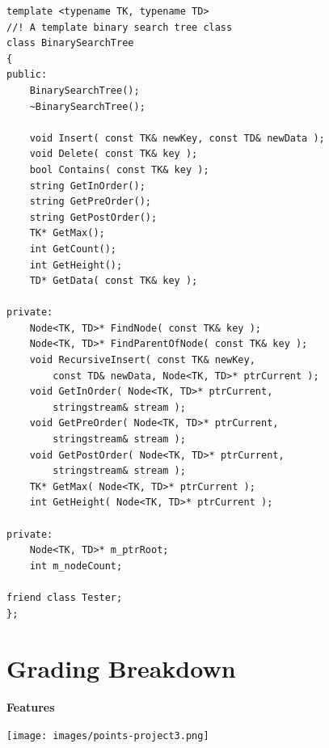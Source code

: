 \documentclass[a4paper,12pt,oneside]{book}
\begin{document}
    \begin{lstlisting}[style=code]
template <typename TK, typename TD>
//! A template binary search tree class
class BinarySearchTree
{
public:
    BinarySearchTree();
    ~BinarySearchTree();
    
    void Insert( const TK& newKey, const TD& newData );
    void Delete( const TK& key );
    bool Contains( const TK& key );
    string GetInOrder();
    string GetPreOrder();
    string GetPostOrder();
    TK* GetMax();
    int GetCount();
    int GetHeight();
    TD* GetData( const TK& key );

private:
    Node<TK, TD>* FindNode( const TK& key );
    Node<TK, TD>* FindParentOfNode( const TK& key );
    void RecursiveInsert( const TK& newKey,
        const TD& newData, Node<TK, TD>* ptrCurrent );
    void GetInOrder( Node<TK, TD>* ptrCurrent,
        stringstream& stream );
    void GetPreOrder( Node<TK, TD>* ptrCurrent,
        stringstream& stream );
    void GetPostOrder( Node<TK, TD>* ptrCurrent,
        stringstream& stream );
    TK* GetMax( Node<TK, TD>* ptrCurrent );
    int GetHeight( Node<TK, TD>* ptrCurrent );

private:
    Node<TK, TD>* m_ptrRoot;
    int m_nodeCount;

friend class Tester;
};
    \end{lstlisting}
    
    \chapter*{Grading Breakdown}

    \textbf{Features}

    \begin{center}
        \texttt{[image: images/points-project3.png]}
    \end{center}
\end{document}
